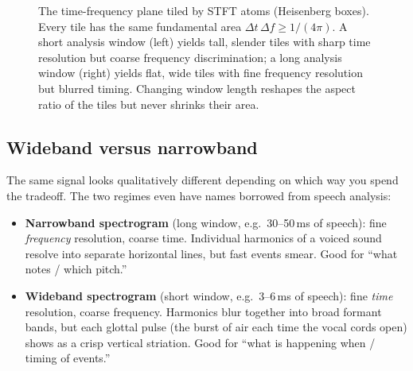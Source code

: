 \begin{figure}[H]
\caption{The time-frequency plane tiled by STFT atoms (Heisenberg boxes). Every tile has the
same fundamental area $\Delta t\,\Delta f \ge 1/(4\pi)$. A short analysis window (left)
yields tall, slender tiles with sharp time resolution but coarse frequency discrimination;
a long analysis window (right) yields flat, wide tiles with fine frequency resolution but
blurred timing. Changing window length reshapes the aspect ratio of the tiles but never
shrinks their area.}
\label{ch10:fig-tiling}
\end{figure}

\subsection{Wideband versus narrowband}

The same signal looks qualitatively different depending on which way you spend the
tradeoff. The two regimes even have names borrowed from speech analysis:

\begin{itemize}
  \item \textbf{Narrowband spectrogram} (long window, e.g.\ 30--50\,ms of speech):
        fine \emph{frequency} resolution, coarse time. Individual harmonics of a
        voiced sound resolve into separate horizontal lines, but fast events
        smear. Good for ``what notes / which pitch.''
  \item \textbf{Wideband spectrogram} (short window, e.g.\ 3--6\,ms of speech):
        fine \emph{time} resolution, coarse frequency. Harmonics blur together
        into broad formant bands, but each glottal pulse (the burst of air each time the vocal cords open) shows as a crisp vertical
        striation. Good for ``what is happening when / timing of events.''
\end{itemize}

